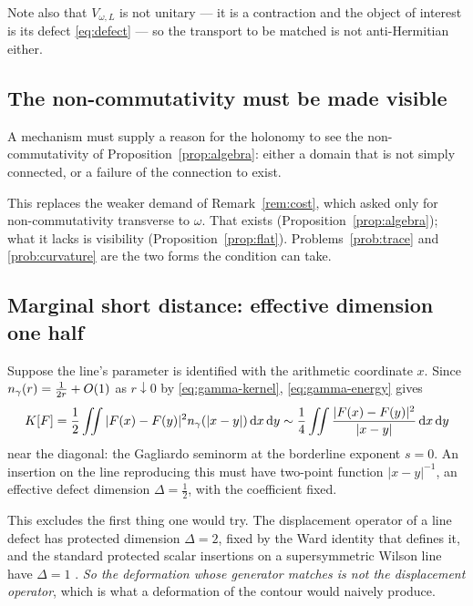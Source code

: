 Note also that $V_{\omega,L}$ is not unitary --- it is a contraction and the
object of interest is its defect \eqref{eq:defect} --- so the transport to be
matched is not anti-Hermitian either.

\subsection{The non-commutativity must be made visible}

\begin{condition}\label{cond:visible}
A mechanism must supply a reason for the holonomy to see the non-commutativity of
Proposition~\ref{prop:algebra}: either a domain that is not simply connected, or a
failure of the connection to exist.
\end{condition}

This replaces the weaker demand of Remark~\ref{rem:cost}, which asked only for
non-commutativity transverse to $\omega$. That exists
(Proposition~\ref{prop:algebra}); what it lacks is visibility
(Proposition~\ref{prop:flat}). Problems~\ref{prob:trace} and \ref{prob:curvature}
are the two forms the condition can take.

\subsection{Marginal short distance: effective dimension one half}

\begin{condition}[Marginality]\label{cond:marginal}
Suppose the line's parameter is identified with the arithmetic coordinate $x$.
Since $n_{\gamma}(r)=\frac1{2r}+O(1)$ as $r\downarrow0$ by \eqref{eq:gamma-kernel},
\eqref{eq:gamma-energy} gives
\[
 K[F]=\frac12\iint|F(x)-F(y)|^2n_{\gamma}(|x-y|)\,\mathrm d x\,\mathrm d y
 \sim\frac14\iint\frac{|F(x)-F(y)|^2}{|x-y|}\,\mathrm d x\,\mathrm d y
\]
near the diagonal: the Gagliardo seminorm at the borderline exponent $s=0$. An
insertion on the line reproducing this must have two-point function $|x-y|^{-1}$,
an effective defect dimension $\Delta=\frac12$, with the coefficient fixed.
\end{condition}

This excludes the first thing one would try. The displacement operator of a line
defect has protected dimension $\Delta=2$, fixed by the Ward identity that defines
it, and the standard protected scalar insertions on a supersymmetric Wilson line
have $\Delta=1$ \cite{GiombiKomatsu,CHMS}. \emph{So the deformation whose
generator matches is not the displacement operator}, which is what a deformation
of the contour would naively produce.

